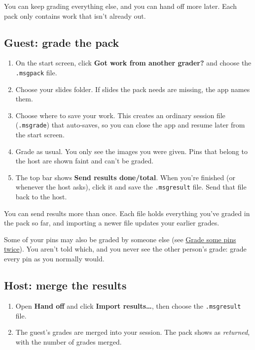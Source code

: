 You can keep grading everything else, and you can hand off more later. Each pack only contains work that isn't already out.

\subsection{Guest: grade the pack}\label{sec:handoff:guest-grade-the-pack}

\begin{enumerate}[topsep=2pt, itemsep=2pt]
\item On the start screen, click \textbf{Got work from another grader?} and choose the \texttt{.msgpack} file.
\item Choose your slides folder. If slides the pack needs are missing, the app names them.
\item Choose where to save your work. This creates an ordinary session file (\texttt{.msgrade}) that auto-saves, so you can close the app and resume later from the start screen.
\item Grade as usual. You only see the images you were given. Pins that belong to the host are shown faint and can't be graded.
\item The top bar shows \textbf{Send results \textperiodcentered{} done/total}. When you're finished (or whenever the host asks), click it and save the \texttt{.msgresult} file. Send that file back to the host.
\end{enumerate}

You can send results more than once. Each file holds everything you've graded in the pack so far, and importing a newer file updates your earlier grades.

Some of your pins may also be graded by someone else (see \hyperref[sec:handoff:grade-some-pins-twice]{Grade some pins twice}). You aren't told which, and you never see the other person's grade: grade every pin as you normally would.

\subsection[Host: merge the results\alsotoc{sec:handoff:replacing-another-graders-grade}{Replacing another grader's grade}]{Host: merge the results}\label{sec:handoff:host-merge-the-results}

\begin{enumerate}[topsep=2pt, itemsep=2pt]
\item Open \textbf{Hand off} and click \textbf{Import results\ldots{}}, then choose the \texttt{.msgresult} file.
\item The guest's grades are merged into your session. The pack shows as \emph{returned}, with the number of grades merged.
\end{enumerate}

